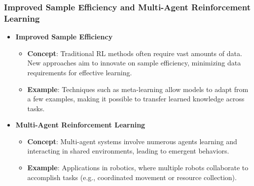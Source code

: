 \documentclass[aspectratio=169]{beamer}
\begin{document}
\begin{frame}[fragile]
    \frametitle{Improved Sample Efficiency and Multi-Agent Reinforcement Learning}
    \begin{itemize}
        \item \textbf{Improved Sample Efficiency}
            \begin{itemize}
                \item \textbf{Concept}: Traditional RL methods often require vast amounts of data. New approaches aim to innovate on sample efficiency, minimizing data requirements for effective learning.
                \item \textbf{Example}: Techniques such as meta-learning allow models to adapt from a few examples, making it possible to transfer learned knowledge across tasks.
            \end{itemize}
        
        \item \textbf{Multi-Agent Reinforcement Learning}
            \begin{itemize}
                \item \textbf{Concept}: Multi-agent systems involve numerous agents learning and interacting in shared environments, leading to emergent behaviors.
                \item \textbf{Example}: Applications in robotics, where multiple robots collaborate to accomplish tasks (e.g., coordinated movement or resource collection).
            \end{itemize}
    \end{itemize}
\end{frame}
\end{document}
